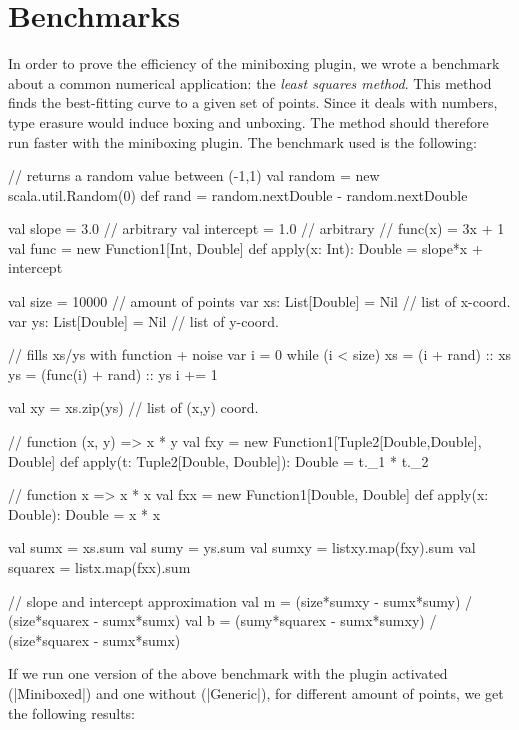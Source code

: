\section{Benchmarks}

In order to prove the efficiency of the miniboxing plugin, we wrote a benchmark about a common numerical application: the \textit{least squares method}. This method finds the best-fitting curve to a given set of points. Since it deals with numbers, type erasure would induce boxing and unboxing. The method should therefore run faster with the miniboxing plugin. The benchmark used is the following:

\begin{lstlisting-nobreak}
 // returns a random value between (-1,1)
 val random = new scala.util.Random(0)
 def rand = random.nextDouble - random.nextDouble
 
 val slope = 3.0  // arbitrary
 val intercept = 1.0  // arbitrary
 // func(x) = 3x + 1
 val func = new Function1[Int, Double] {
   def apply(x: Int): Double =
      slope*x + intercept
 }
 
 val size = 10000 // amount of points
 var xs: List[Double] = Nil // list of x-coord.
 var ys: List[Double] = Nil // list of y-coord.
 
 // fills xs/ys with function + noise
 var i = 0
 while (i < size) {
  xs = (i + rand) :: xs
  ys = (func(i) + rand) :: ys
  i += 1
 }
 
 val xy = xs.zip(ys) // list of (x,y) coord.
 
  // function (x, y) => x * y
 val fxy =
  new Function1[Tuple2[Double,Double], Double] {
     def apply(t: Tuple2[Double, Double]): Double = t._1 * t._2
 }
 
 // function x => x * x
 val fxx = new Function1[Double, Double] {
   def apply(x: Double): Double = x * x
 }
 
 val sumx  = xs.sum
 val sumy  = ys.sum
 val sumxy = listxy.map(fxy).sum
 val squarex = listx.map(fxx).sum
 
 // slope and intercept approximation
 val m = (size*sumxy - sumx*sumy) / (size*squarex - sumx*sumx)
 val b = (sumy*squarex - sumx*sumxy) / (size*squarex - sumx*sumx)
\end{lstlisting-nobreak}
%  

If we run one version of the above benchmark with the plugin activated (|Miniboxed|) and one without (|Generic|), for different amount of points, we get the following results:

